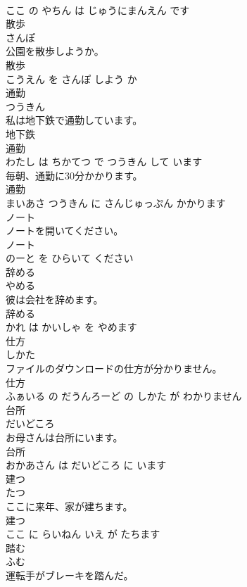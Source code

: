 \documentclass[8pt]{extreport}
\begin{document}
\begin{CJK}{UTF8}{min}
\\	ここ の やちん は じゅうにまんえん です			
\\	散歩	
\\	さんぽ			
\\	公園を散歩しようか。	
\\	散歩 
\\	こうえん を さんぽ しよう か			
\\	通勤	
\\	つうきん			
\\	私は地下鉄で通勤しています。	
\\	地下鉄 
\\	通勤 
\\	わたし は ちかてつ で つうきん して います			
\\	毎朝、通勤に30分かかります。	
\\	通勤 
\\	まいあさ つうきん に さんじゅっぷん かかります			
\\	ノート	
\\	ノートを開いてください。	
\\	ノート 
\\	のーと を ひらいて ください			
\\	辞める	
\\	やめる			
\\	彼は会社を辞めます。	
\\	辞める 
\\	かれ は かいしゃ を やめます			
\\	仕方	
\\	しかた			
\\	ファイルのダウンロードの仕方が分かりません。	
\\	仕方 
\\	ふぁいる の だうんろーど の しかた が わかりません			
\\	台所	
\\	だいどころ			
\\	お母さんは台所にいます。	
\\	台所 
\\	おかあさん は だいどころ に います			
\\	建つ	
\\	たつ			
\\	ここに来年、家が建ちます。	
\\	建つ 
\\	ここ に らいねん いえ が たちます			
\\	踏む	
\\	ふむ			
\\	運転手がブレーキを踏んだ。	

\end{CJK}
\end{document}
